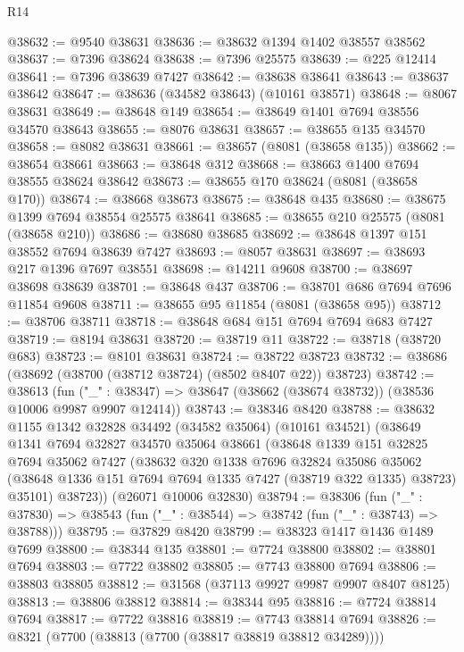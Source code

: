 \begin{lexlean}{R14}
\begin{coremodule}
@38632 := @9540 @38631
@38636 := @38632 @1394 @1402 @38557 @38562
@38637 := @7396 @38624
@38638 := @7396 @25575
@38639 := @225 @12414
@38641 := @7396 @38639 @7427
@38642 := @38638 @38641
@38643 := @38637 @38642
@38647 := @38636 (@34582 @38643) (@10161 @38571)
@38648 := @8067 @38631
@38649 := @38648 @149
@38654 := @38649 @1401 @7694 @38556 @34570 @38643
@38655 := @8076 @38631
@38657 := @38655 @135 @34570
@38658 := @8082 @38631
@38661 := @38657 (@8081 (@38658 @135))
@38662 := @38654 @38661
@38663 := @38648 @312
@38668 := @38663 @1400 @7694 @38555 @38624 @38642
@38673 := @38655 @170 @38624 (@8081 (@38658 @170))
@38674 := @38668 @38673
@38675 := @38648 @435
@38680 := @38675 @1399 @7694 @38554 @25575 @38641
@38685 := @38655 @210 @25575 (@8081 (@38658 @210))
@38686 := @38680 @38685
@38692 := @38648 @1397 @151 @38552 @7694 @38639 @7427
@38693 := @8057 @38631
@38697 := @38693 @217 @1396 @7697 @38551
@38698 := @14211 @9608
@38700 := @38697 @38698 @38639
@38701 := @38648 @437
@38706 := @38701 @686 @7694 @7696 @11854 @9608
@38711 := @38655 @95 @11854 (@8081 (@38658 @95))
@38712 := @38706 @38711
@38718 := @38648 @684 @151 @7694 @7694 @683 @7427
@38719 := @8194 @38631
@38720 := @38719 @11
@38722 := @38718 (@38720 @683)
@38723 := @8101 @38631
@38724 := @38722 @38723
@38732 := @38686 (@38692 (@38700 (@38712 @38724) (@8502 @8407 @22)) @38723)
@38742 := @38613
    (fun ("_" : @38347) => @38647 (@38662 (@38674 @38732)) (@38536 @10006 @9987 @9907 @12414))
@38743 := @38346 @8420
@38788 := @38632
    @1155
    @1342
    @32828
    @34492
    (@34582 @35064)
    (@10161 @34521)
    (@38649
      @1341
      @7694
      @32827
      @34570
      @35064
      @38661
      (@38648
        @1339
        @151
        @32825
        @7694
        @35062
        @7427
        (@38632
          @320
          @1338
          @7696
          @32824
          @35086
          @35062
          (@38648 @1336 @151 @7694 @7694 @1335 @7427 (@38719 @322 @1335) @38723)
          @35101)
        @38723))
    (@26071 @10006 @32830)
@38794 := @38306
    (fun ("_" : @37830) => @38543 (fun ("_" : @38544) => @38742 (fun ("_" : @38743) => @38788)))
@38795 := @37829 @8420
@38799 := @38323 @1417 @1436 @1489 @7699
@38800 := @38344 @135
@38801 := @7724 @38800
@38802 := @38801 @7694
@38803 := @7722 @38802
@38805 := @7743 @38800 @7694
@38806 := @38803 @38805
@38812 := @31568 (@37113 @9927 @9987 @9907 @8407 @8125)
@38813 := @38806 @38812
@38814 := @38344 @95
@38816 := @7724 @38814 @7694
@38817 := @7722 @38816
@38819 := @7743 @38814 @7694
@38826 := @8321 (@7700 (@38813 (@7700 (@38817 @38819 @38812 @34289))))

\end{coremodule}
\end{lexlean}
